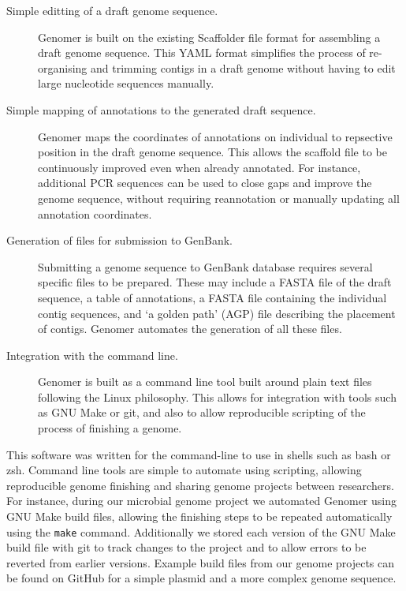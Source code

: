 \documentclass[10pt]{article}
\begin{document}
\begin{description} 

  \item[Simple editting of a draft genome sequence.]{Genomer is built on the
  existing Scaffolder \cite{barton2012} file format for assembling a draft
  genome sequence. This YAML \cite{yaml} format simplifies the process of
  re-organising and trimming contigs in a draft genome without having to edit
  large nucleotide sequences manually.}

  \item[Simple mapping of annotations to the generated draft sequence.]{Genomer
  maps the coordinates of annotations on individual to repsective position in
  the draft genome sequence. This allows the scaffold file to be continuously
  improved even when already annotated. For instance, additional PCR sequences
  can be used to close gaps and improve the genome sequence, without requiring
  reannotation or manually updating all annotation coordinates.}

  \item[Generation of files for submission to GenBank.]{Submitting a genome
  sequence to GenBank database requires several specific files to be prepared.
  These may include a FASTA file of the draft sequence, a table of annotations,
  a FASTA file containing the individual contig sequences, and `a golden path'
  (AGP) \cite{agp-spec} file describing the placement of contigs. Genomer
  automates the generation of all these files.}

  \item[Integration with the command line.]{Genomer is built as a command line
  tool built around plain text files following the Linux philosophy. This
  allows for integration with tools such as GNU Make or git, and also to allow
  reproducible scripting of the process of finishing a genome.}

\end{description}

This software was written for the command-line to use in shells such as bash or
zsh. Command line tools are simple to automate using scripting, allowing
reproducible genome finishing and sharing genome projects between researchers.
For instance, during our microbial genome project we automated Genomer using
GNU Make build files, allowing the finishing steps to be repeated automatically
using the \verb+make+ command. Additionally we stored each version of the GNU
Make build file with git \cite{git-scm} to track changes to the project and to
allow errors to be reverted from earlier versions. Example build files from our
genome projects can be found on GitHub for a simple plasmid
\cite{plasmid-github} and a more complex genome \cite{genome-github} sequence.
\end{document}
